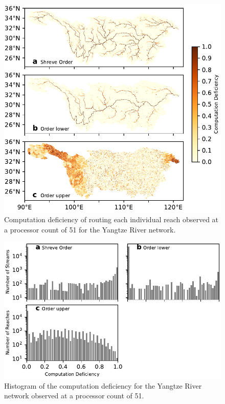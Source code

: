 \documentclass[water,article,submit,pdftex,moreauthors]{Definitions/mdpi}
\begin{document}
\begin{figure}[H]
	\includegraphics[width=11.5cm]{fig/computation_deficiency_yangtze.pdf}
	\caption{Computation deficiency of routing each individual reach observed at a processor count of 51 for the Yangtze River network. \label{fig:computation_deficiency_yangtze}}
\end{figure}

\begin{figure}[H]
	\includegraphics[width=13.5cm]{fig/computation_cost_hist_yangtze.pdf}
	\caption{Histogram of the computation deficiency for the Yangtze River network observed at a processor count of 51. \label{fig:computation_deficiency_hist_yangtze}}
\end{figure}
\end{document}

